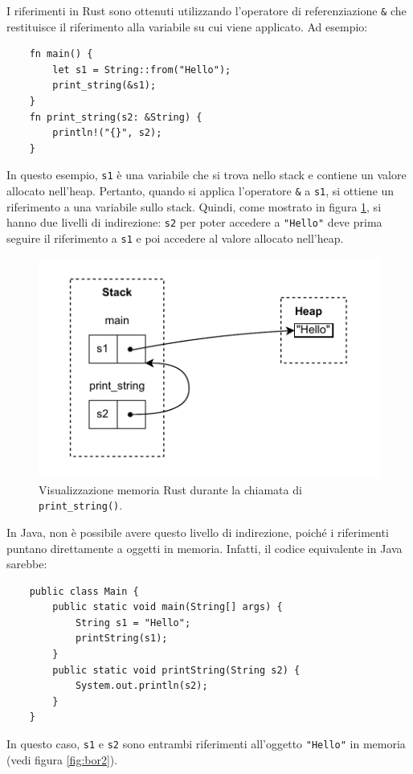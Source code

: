I riferimenti in Rust sono ottenuti utilizzando l'operatore di referenziazione \texttt{\&} che restituisce il riferimento alla variabile su cui viene applicato. Ad esempio:
\begin{verbatim}
    fn main() {
        let s1 = String::from("Hello");
        print_string(&s1); 
    }
    fn print_string(s2: &String) {
        println!("{}", s2);
    }
\end{verbatim} 
In questo esempio, \texttt{s1} è una variabile che si trova nello stack e contiene un valore allocato nell'heap. Pertanto, quando si applica l'operatore \texttt{\&} a \texttt{s1}, si ottiene un riferimento a una variabile sullo stack. Quindi, come mostrato in figura \ref{fig:bor1}, si hanno due livelli di indirezione: \texttt{s2} per poter accedere a \texttt{"Hello"} deve prima seguire il riferimento a \texttt{s1} e poi accedere al valore allocato nell'heap.  
\begin{figure}[H]
    \centering
    \includegraphics[scale = 1]{Figures/bor1.drawio.pdf}
    \caption{Visualizzazione memoria Rust durante la chiamata di \texttt{print\_string()}.}
    \label{fig:bor1}
\end{figure} 
In Java, non è possibile avere questo livello di indirezione, poiché i riferimenti puntano direttamente a oggetti in memoria. Infatti, il codice equivalente in Java sarebbe:
\begin{verbatim}
    public class Main {
        public static void main(String[] args) {
            String s1 = "Hello";
            printString(s1); 
        }
        public static void printString(String s2) {
            System.out.println(s2);
        }
    }
\end{verbatim}
In questo caso, \texttt{s1} e \texttt{s2} sono entrambi riferimenti all'oggetto \texttt{"Hello"} in memoria (vedi figura \ref{fig:bor2}).
